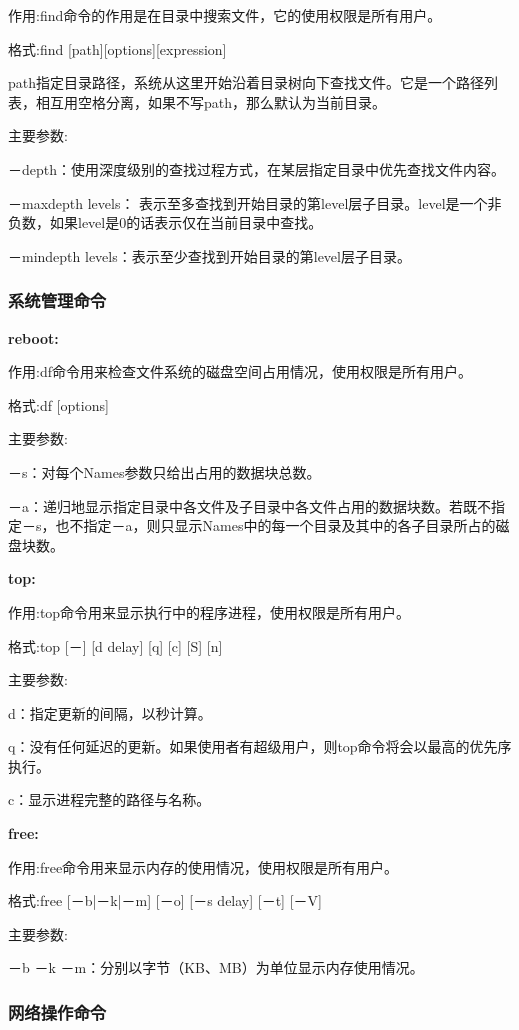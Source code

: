 作用:find命令的作用是在目录中搜索文件，它的使用权限是所有用户。

格式:find [path][options][expression]

path指定目录路径，系统从这里开始沿着目录树向下查找文件。它是一个路径列表，相互用空格分离，如果不写path，那么默认为当前目录。

主要参数:

－depth：使用深度级别的查找过程方式，在某层指定目录中优先查找文件内容。

－maxdepth levels：
表示至多查找到开始目录的第level层子目录。level是一个非负数，如果level是0的话表示仅在当前目录中查找。

－mindepth levels：表示至少查找到开始目录的第level层子目录。

\subsubsection{系统管理命令}

\textbf{reboot:}

作用:df命令用来检查文件系统的磁盘空间占用情况，使用权限是所有用户。

格式:df [options]

主要参数:

－s：对每个Names参数只给出占用的数据块总数。

－a：递归地显示指定目录中各文件及子目录中各文件占用的数据块数。若既不指定－s，也不指定－a，则只显示Names中的每一个目录及其中的各子目录所占的磁盘块数。

\textbf{top:}

作用:top命令用来显示执行中的程序进程，使用权限是所有用户。

格式:top [－] [d delay] [q] [c] [S] [n]

主要参数:

d：指定更新的间隔，以秒计算。

q：没有任何延迟的更新。如果使用者有超级用户，则top命令将会以最高的优先序执行。

c：显示进程完整的路径与名称。

\textbf{free:}

作用:free命令用来显示内存的使用情况，使用权限是所有用户。

格式:free [－b|－k|－m] [－o] [－s delay] [－t] [－V]

主要参数:

－b －k －m：分别以字节（KB、MB）为单位显示内存使用情况。

\subsubsection{网络操作命令}

